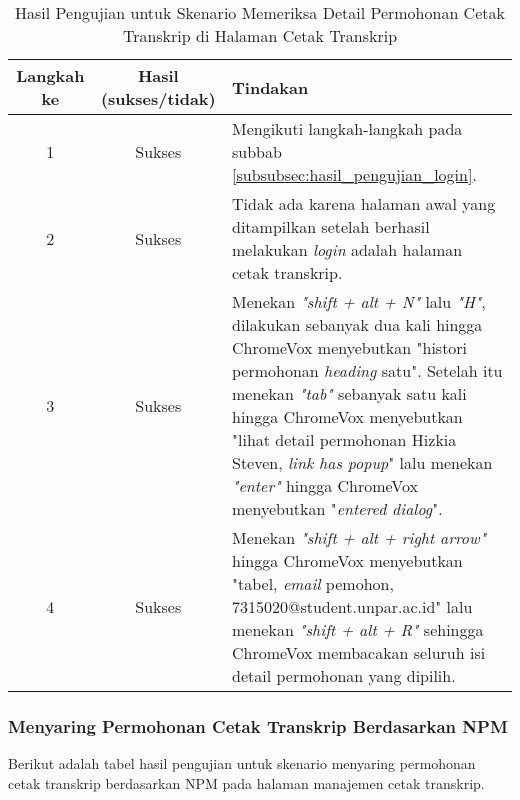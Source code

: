 \begin{table}[H]
    \centering 
    \caption{Hasil Pengujian untuk Skenario Memeriksa Detail Permohonan Cetak Transkrip di Halaman Cetak Transkrip}
    \label{tab:hasil_pengujian_memeriksa_detail_permohonan_cetak_transkrip_di_halaman_cetak_transkrip}
    \begin{tabular}{|c|c|p{10cm}|}
        \toprule
        Langkah ke & Hasil (sukses/tidak) & Tindakan \\

        \midrule
        1 & Sukses & Mengikuti langkah-langkah pada subbab \ref{subsubsec:hasil_pengujian_login}. \\
        2 & Sukses & Tidak ada karena halaman awal yang ditampilkan setelah berhasil melakukan \textit{login} adalah halaman cetak transkrip. \\
        3 & Sukses & Menekan \textit{"shift + alt + N"} lalu \textit{"H"}, dilakukan sebanyak dua kali hingga ChromeVox menyebutkan "histori permohonan \textit{heading} satu". Setelah itu menekan \textit{"tab"} sebanyak satu kali hingga ChromeVox menyebutkan "lihat detail permohonan Hizkia Steven, \textit{link has popup}" lalu menekan \textit{"enter"} hingga ChromeVox menyebutkan "\textit{entered dialog}". \\
        4 & Sukses & Menekan \textit{"shift + alt + right arrow"} hingga ChromeVox menyebutkan "tabel, \textit{email} pemohon, 7315020@student.unpar.ac.id" lalu menekan \textit{"shift + alt + R"} sehingga ChromeVox membacakan seluruh isi detail permohonan yang dipilih. \\

        \bottomrule

    \end{tabular}
\end{table}

\subsubsection{Menyaring Permohonan Cetak Transkrip Berdasarkan NPM}
\label{subsubsec:hasil_pengujian_menyaring_permohonan_cetak_transkrip_berdasarkan_npm}
Berikut adalah tabel hasil pengujian untuk skenario menyaring permohonan cetak transkrip berdasarkan NPM pada halaman manajemen cetak transkrip.

